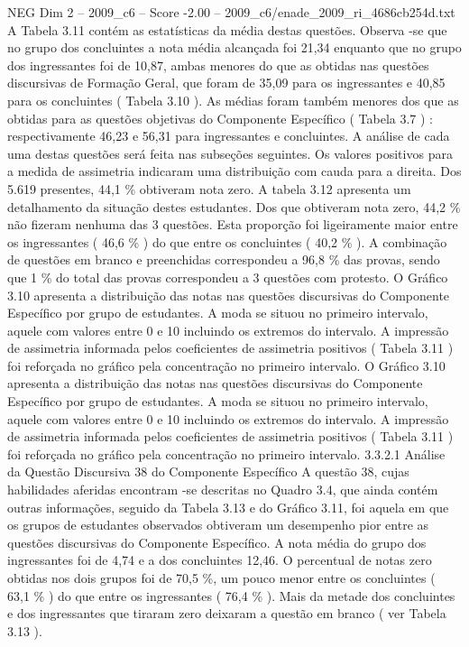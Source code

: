 \begin{textsample}{NEG Dim 2 – 2009\_c6 – Score -2.00 – 2009\_c6/enade\_2009\_ri\_4686cb254d.txt}
A Tabela 3.11 contém as estatísticas da média destas questões.
Observa -se que no grupo dos concluintes a nota média alcançada foi 21,34 enquanto que no grupo dos ingressantes foi de 10,87, ambas menores do que as obtidas nas questões discursivas de Formação Geral, que foram de 35,09 para os ingressantes e 40,85 para os concluintes ( Tabela 3.10 ).
As médias foram também menores dos que as obtidas para as questões objetivas do Componente Específico ( Tabela 3.7 ) : respectivamente 46,23 e 56,31 para ingressantes e concluintes.
A análise de cada uma destas questões será feita nas subseções seguintes.
Os valores positivos para a medida de assimetria indicaram uma distribuição com cauda para a direita.
Dos 5.619 presentes, 44,1 \% obtiveram nota zero.
A tabela 3.12 apresenta um detalhamento da situação destes estudantes.
Dos que obtiveram nota zero, 44,2 \% não fizeram nenhuma das 3 questões.
Esta proporção foi ligeiramente maior entre os ingressantes ( 46,6 \% ) do que entre os concluintes ( 40,2 \% ).
A combinação de questões em branco e preenchidas correspondeu a 96,8 \% das provas, sendo que 1 \% do total das provas correspondeu a 3 questões com protesto.
O Gráfico 3.10 apresenta a distribuição das notas nas questões discursivas do Componente Específico por grupo de estudantes.
A moda se situou no primeiro intervalo, aquele com valores entre 0 e 10 incluindo os extremos do intervalo.
A impressão de assimetria informada pelos coeficientes de assimetria positivos ( Tabela 3.11 ) foi reforçada no gráfico pela concentração no primeiro intervalo.
O Gráfico 3.10 apresenta a distribuição das notas nas questões discursivas do Componente Específico por grupo de estudantes.
A moda se situou no primeiro intervalo, aquele com valores entre 0 e 10 incluindo os extremos do intervalo.
A impressão de assimetria informada pelos coeficientes de assimetria positivos ( Tabela 3.11 ) foi reforçada no gráfico pela concentração no primeiro intervalo. 3.3.2.1 Análise da Questão Discursiva 38 do Componente Específico A questão 38, cujas habilidades aferidas encontram -se descritas no Quadro 3.4, que ainda contém outras informações, seguido da Tabela 3.13 e do Gráfico 3.11, foi aquela em que os grupos de estudantes observados obtiveram um desempenho pior entre as questões discursivas do Componente Específico.
A nota média do grupo dos ingressantes foi de 4,74 e a dos concluintes 12,46.
O percentual de notas zero obtidas nos dois grupos foi de 70,5 \%, um pouco menor entre os concluintes ( 63,1 \% ) do que entre os ingressantes ( 76,4 \% ).
Mais da metade dos concluintes e dos ingressantes que tiraram zero deixaram a questão em branco ( ver Tabela 3.13 ).

\end{textsample}
